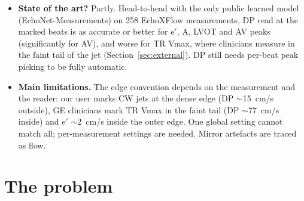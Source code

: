 \documentclass[10pt,a4paper]{article}
\begin{document}
\begin{itemize}
establish, these parts are new: (i) a globally optimal DP for the Doppler maximum-velocity envelope, (ii) its outer-edge cost with a free
interior, (iii) density normalisation so that one setting serves PW, CW and TDI, (iv) the smoothness prior expressed as a physical acceleration, and
(v) post-hoc, per-column aliasing unwrapping on the rendered display (Section~\ref{sec:novelty}).
\item \textbf{State of the art?} Partly. Head-to-head with the only public learned model (EchoNet-Measurements) on 258 EchoXFlow
measurements, DP read at the marked beats is as accurate or better for e$'$, A, LVOT and AV peaks (significantly for AV), and
worse for TR Vmax, where clinicians measure in the faint tail of the jet (Section~\ref{sec:external}). DP still needs per-beat
peak picking to be fully automatic.
\item \textbf{Main limitations.} The edge convention depends on the measurement and the reader: our user marks CW jets at the dense
edge (DP $\sim$15~cm/s outside), GE clinicians mark TR Vmax in the faint tail (DP $\sim$77~cm/s inside) and e$'$ $\sim$2~cm/s inside
the outer edge. One global setting cannot match all; per-measurement settings are needed. Mirror artefacts are traced as flow.
\end{itemize}

\tableofcontents

\section{The problem}
\end{document}
